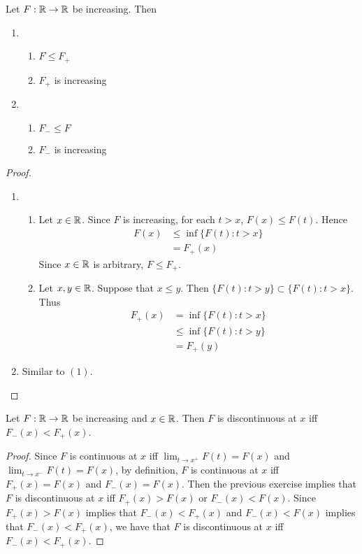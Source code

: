 \documentclass{book}
\begin{document}
	\begin{ex}
		Let $F:\mathbb{R} \rightarrow \mathbb{R}$ be increasing. Then 
		\begin{enumerate}
			\item 
			\begin{enumerate}
				\item $F \leq F_+$
				\item$F_+$ is increasing
			\end{enumerate}
			\item 
			\begin{enumerate}
				\item $F_- \leq F$
				\item $F_-$ is increasing
			\end{enumerate}
		\end{enumerate}
	\end{ex}

	\begin{proof}\
		\begin{enumerate}
			\item 
			\begin{enumerate}
				\item  Let $x \in \mathbb{R}$. Since $F$ is increasing, for each $t > x$, $F(x) \leq F(t)$. Hence 
				\begin{align*}
					F(x)
					& \leq \inf \{F(t): t>x \} \\
					& = F_+(x)
				\end{align*}
				Since $x \in \mathbb{R}$ is arbitrary, $F \leq F_+$.
				\item  Let $x,y \in \mathbb{R}$. Suppose that $x \leq y$. Then $\{F(t): t>y \} \subset \{F(t): t>x \}$. Thus 
				\begin{align*}
					F_+(x)
					& = \inf \{F(t): t>x \} \\
					& \leq \inf \{F(t): t>y \} \\
					& = F_+(y)
				\end{align*}
			\end{enumerate}
			\item Similar to $(1)$.
		\end{enumerate}
	\end{proof}

	\begin{ex}
		Let $F:\mathbb{R} \rightarrow \mathbb{R}$ be increasing and $x \in \mathbb{R}$. Then $F$ is discontinuous at $x$ iff $F_-(x) < F_+(x)$.
	\end{ex}

	\begin{proof}
		Since $F$ is continuous at $x$ iff $\lim_{t \rightarrow x^+}F(t) = F(x)$ and $\lim_{t \rightarrow x^-}F(t) = F(x)$, by definition, $F$ is continuous at $x$ iff $F_+(x) = F(x)$ and $F_-(x) = F(x)$. Then the previous exercise implies that $F$ is discontinuous at $x$ iff $F_+(x) > F(x)$ or $F_-(x) < F(x)$. Since $F_+(x) > F(x)$ implies that $F_-(x) < F_+(x)$ and $F_-(x) < F(x)$ implies that $F_-(x) < F_+(x)$, we have that $F$ is discontinuous at $x$ iff $F_-(x) < F_+(x)$.
 	\end{proof}
	
\end{document}
